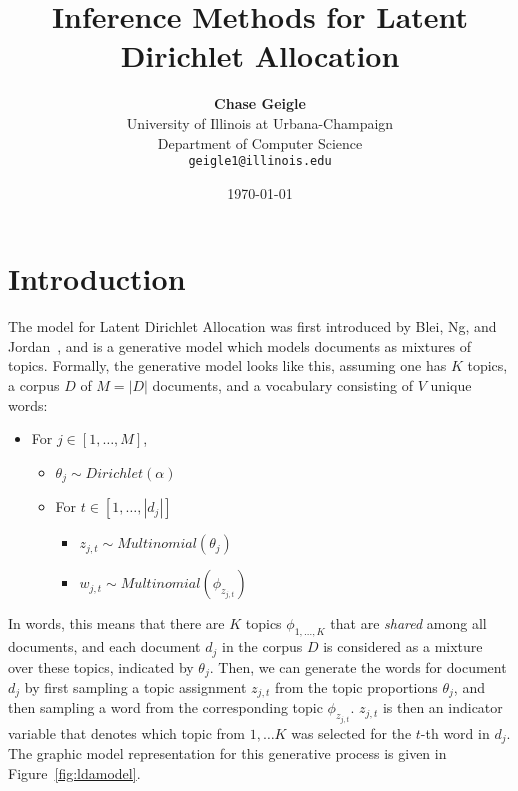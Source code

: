 \documentclass[11pt]{article}
\begin{document}
\title{Inference Methods for Latent Dirichlet Allocation}
\date{\today}
\author{%
    \Large{\textbf{Chase Geigle}}\\
    University of Illinois at Urbana-Champaign\\
    Department of Computer Science\\
    \texttt{geigle1@illinois.edu}
}
\maketitle


\section{Introduction}

The model for Latent Dirichlet Allocation was first introduced by Blei, Ng,
and Jordan~\cite{Blei:2003:LDA}, and is a generative model which models
documents as mixtures of topics. Formally, the generative model looks like
this, assuming one has $K$ topics, a corpus $D$ of $M=|D|$ documents, and a
vocabulary consisting of $V$ unique words:

\begin{itemize}
  \item For $j\in[1, \ldots, M]$,
    \begin{itemize}
      \item $\theta_j \sim Dirichlet(\alpha)$
      \item For $t \in [1,\ldots, |d_j|]$
        \begin{itemize}
          \item $z_{j,t} \sim Multinomial(\theta_j)$
          \item $w_{j,t} \sim Multinomial(\phi_{z_{j,t}})$
        \end{itemize}
    \end{itemize}
\end{itemize}

In words, this means that there are $K$ topics $\phi_{1,\ldots,K}$ that are
\emph{shared} among all documents, and each document $d_j$ in the corpus
$D$ is considered as a mixture over these topics, indicated by $\theta_j$.
Then, we can generate the words for document $d_j$ by first sampling a
topic assignment $z_{j,t}$ from the topic proportions $\theta_j$, and then
sampling a word from the corresponding topic $\phi_{z_{j,t}}$. $z_{j,t}$ is
then an indicator variable that denotes which topic from $1,\ldots K$ was
selected for the $t$-th word in $d_j$. The graphic model representation for
this generative process is given in Figure~\ref{fig:ldamodel}.
\end{document}
